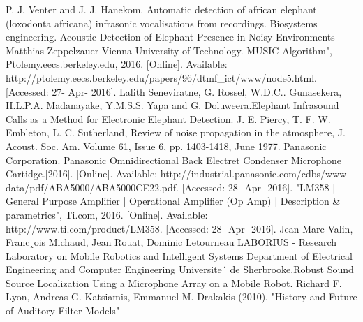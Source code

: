 \documentclass[11pt]{article}
\numberwithin{figure}{section}
\numberwithin{table}{section}
\begin{document}
\begin{thebibliography}{1}
 P. J. Venter and J. J. Hanekom. Automatic detection of african elephant (loxodonta africana) infrasonic vocalisations from recordings. Biosystems engineering.
 Acoustic Detection of Elephant Presence in Noisy Environments Matthias Zeppelzauer Vienna University of Technology.
 MUSIC Algorithm", Ptolemy.eecs.berkeley.edu, 2016. [Online]. Available: http://ptolemy.eecs.berkeley.edu/papers/96/dtmf\_ict/www/node5.html. [Accessed: 27- Apr- 2016].
 Lalith Seneviratne, G. Rossel, W.D.C.. Gunasekera, H.L.P.A. Madanayake, Y.M.S.S. Yapa and G. Doluweera.Elephant Infrasound Calls as a Method for Electronic Elephant Detection.
 J. E. Piercy, T. F. W. Embleton, L. C. Sutherland, Review of noise propagation in the atmosphere, J. Acoust. Soc. Am. Volume 61, Issue 6, pp. 1403-1418, June 1977.
 Panasonic Corporation. Panasonic Omnidirectional Back Electret Condenser Microphone Cartidge.[2016].  [Online]. Available: http://industrial.panasonic.com/cdbs/www-data/pdf/ABA5000/ABA5000CE22.pdf. [Accessed: 28- Apr- 2016].
"LM358 | General Purpose Amplifier | Operational Amplifier (Op Amp) | Description \& parametrics", Ti.com, 2016. [Online]. Available: http://www.ti.com/product/LM358. [Accessed: 28- Apr- 2016].
Jean-Marc Valin, Franc¸ois Michaud, Jean Rouat, Dominic Letourneau LABORIUS - Research Laboratory on Mobile Robotics and Intelligent Systems Department of Electrical Engineering and Computer Engineering Universite´ de Sherbrooke.Robust Sound Source Localization Using a Microphone Array on a Mobile Robot.
 Richard F. Lyon, Andreas G. Katsiamis, Emmanuel M. Drakakis (2010). "History and Future of Auditory Filter Models"

\end{thebibliography}
\end{document}

